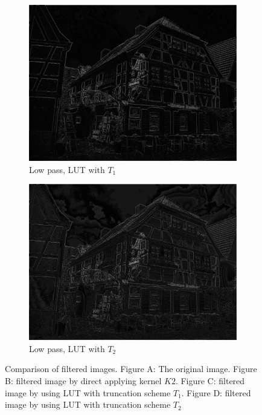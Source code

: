 \documentclass[12pt]{amsart}
\theoremstyle{definition}
\theoremstyle{remark}
\numberwithin{thm}{section}
\begin{document}
\begin{figure}[h]
\begin{subfigure}[b]{0.4\textwidth} \includegraphics[width=\textwidth]{house_lut_212.png} \caption{Low pass, LUT with $T_1$} %
\end{subfigure}
\begin{subfigure}[b]{0.4\textwidth} \includegraphics[width=\textwidth]{house_lut_424.png} \caption{Low pass, LUT with $T_2$} \end{subfigure}
\caption{Comparison of filtered images. Figure A: The original image. Figure B: filtered image by direct applying kernel $K2$. Figure C: filtered image by using LUT with truncation scheme $T_1$. Figure D: filtered image by using LUT with truncation scheme $T_2$}
\label{fig:house} 
\end{figure}
\end{document}
